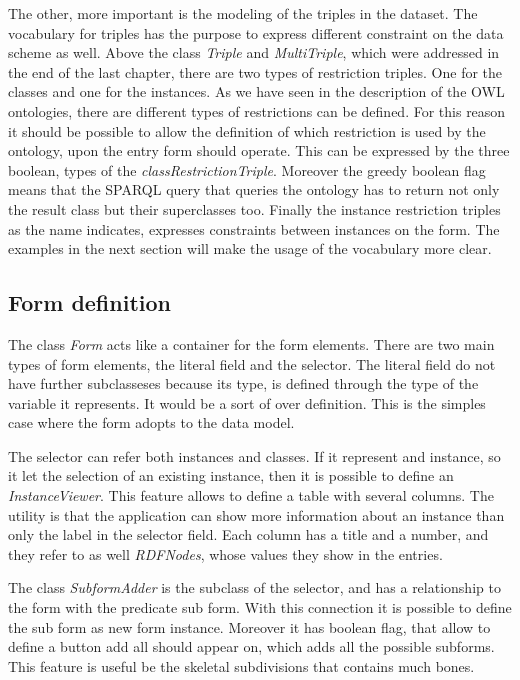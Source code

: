 
The other, more important is the modeling of the triples in the dataset. The vocabulary for triples has the purpose to express different constraint on the data scheme as well. Above the class \textit{Triple} and \textit{MultiTriple}, which were addressed in the end of the last chapter, there are two types of restriction triples. One for the classes and one for the instances. As we have seen in the description of the OWL ontologies, there are different types of restrictions can be defined. For this reason it should be possible to allow the definition of which restriction is used by the ontology, upon the entry form should operate. This can be expressed by the three boolean, types of the \textit{classRestrictionTriple}. Moreover the greedy boolean flag means that the SPARQL query that queries the ontology has to return not only the result class but their superclasses too. Finally the instance restriction triples as the name indicates, expresses constraints between instances on the form. The examples in the next section will make the usage of the vocabulary more clear.


\subsection{Form definition}

The class \textit{Form} acts like a container for the form elements. There are two main types of form elements, the literal field and the selector. The literal field do not have further subclasseses because its type, is defined through the type of the variable it represents. It would be a sort of over definition. This is the simples case where the form adopts to the data model.

The selector can refer both instances and classes. If it represent and instance, so it let the selection of an existing instance, then it is possible to define an \textit{InstanceViewer}. This feature allows to define a table with several columns. The utility is that the application can show more information about an instance than only the label in the selector field. Each column has a title and a number, and they refer to as well \textit{RDFNodes}, whose values they show in the entries.

The class \textit{SubformAdder} is the subclass of the selector, and has a relationship to the form with the predicate sub form. With this connection it is possible to define the sub form as new form instance. Moreover it has boolean flag, that allow to define a button add all should appear on, which adds all the possible subforms. This feature is useful be the skeletal subdivisions that contains much bones.



